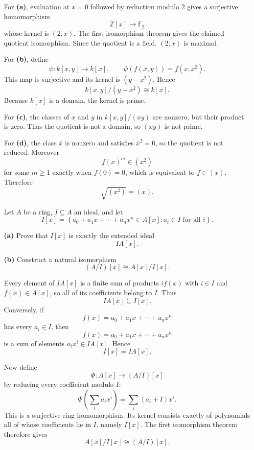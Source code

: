 \begin{solution}
For \textbf{(a)}, evaluation at \(x=0\) followed by reduction modulo \(2\)
gives a surjective homomorphism
\[
\mathbb Z[x]\longrightarrow\mathbb F_2
\]
whose kernel is \((2,x)\). The first isomorphism theorem gives the claimed
quotient isomorphism. Since the quotient is a field, \((2,x)\) is maximal.

For \textbf{(b)}, define
\[
\psi:k[x,y]\longrightarrow k[x],
\qquad
\psi(f(x,y))=f(x,x^2).
\]
This map is surjective and its kernel is \((y-x^2)\). Hence
\[
k[x,y]/(y-x^2)\cong k[x].
\]
Because \(k[x]\) is a domain, the kernel is prime.

For \textbf{(c)}, the classes of \(x\) and \(y\) in
\(k[x,y]/(xy)\) are nonzero, but their product is zero. Thus the quotient
is not a domain, so \((xy)\) is not prime.

For \textbf{(d)}, the class \(\bar x\) is nonzero and satisfies
\(\bar x^2=0\), so the quotient is not reduced. Moreover
\[
f(x)^m\in(x^2)
\]
for some \(m\ge1\) exactly when \(f(0)=0\), which is equivalent to
\(f\in(x)\). Therefore
\[
\sqrt{(x^2)}=(x).
\]
\end{solution}


\begin{problem}[CP-V-0010]
\label{prob:cp-v-0010}
Let \(A\) be a ring, \(I\subseteq A\) an ideal, and let
\[
I[x]=\left\{a_0+a_1x+\cdots+a_nx^n\in A[x]:a_i\in I\text{ for all }i\right\}.
\]

\textbf{(a)} Prove that \(I[x]\) is exactly the extended ideal
\[
IA[x].
\]

\textbf{(b)} Construct a natural isomorphism
\[
(A/I)[x]\cong A[x]/I[x].
\]
\end{problem}

\begin{solution}
Every element of \(IA[x]\) is a finite sum of products \(if(x)\) with
\(i\in I\) and \(f(x)\in A[x]\), so all of its coefficients belong to \(I\).
Thus
\[
IA[x]\subseteq I[x].
\]
Conversely, if
\[
f(x)=a_0+a_1x+\cdots+a_nx^n
\]
has every \(a_i\in I\), then
\[
f(x)=a_0+a_1x+\cdots+a_nx^n
\]
is a sum of elements \(a_ix^i\in IA[x]\). Hence
\[
I[x]=IA[x].
\]

Now define
\[
\Phi:A[x]\longrightarrow (A/I)[x]
\]
by reducing every coefficient modulo \(I\):
\[
\Phi\!\left(\sum_i a_ix^i\right)=\sum_i(a_i+I)x^i.
\]
This is a surjective ring homomorphism. Its kernel consists exactly of
polynomials all of whose coefficients lie in \(I\), namely \(I[x]\).
The first isomorphism theorem therefore gives
\[
A[x]/I[x]\cong(A/I)[x].
\]
\end{solution}



